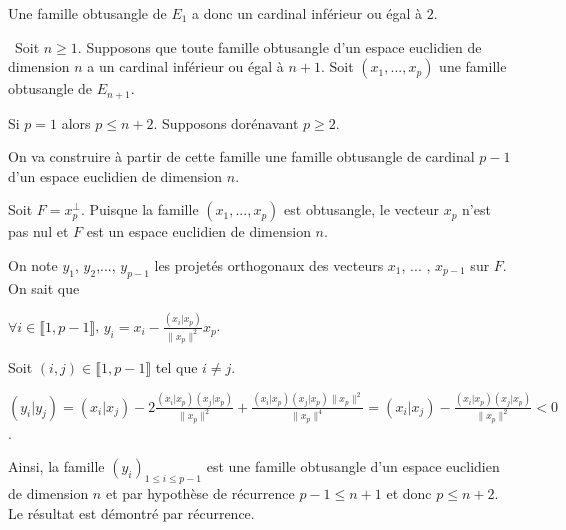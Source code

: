 {{Une famille obtusangle de $E_1$ a donc un cardinal inférieur ou égal à $2$.

\textbullet~Soit $n\geqslant1$. Supposons que toute famille obtusangle d'un espace euclidien de dimension $n$ a un cardinal inférieur ou égal à $n+1$. Soit $(x_1,...,x_p)$ une famille obtusangle de $E_{n+1}$.

Si $p = 1$ alors $p\leqslant n+2$. Supposons dorénavant $p\geqslant2$.

On va construire à partir de cette famille une famille obtusangle de cardinal $p-1$ d'un espace euclidien de dimension $n$.

Soit $F=x_p^\bot$. Puisque la famille $(x_1,...,x_p)$ est obtusangle, le vecteur $x_p$ n'est pas nul et $F$ est un espace euclidien de dimension $n$.

On note $y_1$, $y_2$,..., $y_{p-1}$ les projetés orthogonaux des vecteurs $x_1$, ... , $x_{p-1}$ sur $F$. On sait que

\begin{center}
$\forall i\in\llbracket1,p-1\rrbracket$, $y_i =x_i -\frac{\left(x_i|x_p\right)}{\|x_p\|^2}x_p$.
\end{center}

Soit $(i,j)\in\llbracket1,p-1\rrbracket$ tel que $i\neq j$.

\begin{center}
$\left(y_i|y_j\right)=\left(x_i|x_j\right)-2\frac{\left(x_i|x_p\right)\left(x_j|x_p\right)}{\|x_p\|^2}+\frac{\left(x_i|x_p\right)\left(x_j|x_p\right)\|x_p\|^2}{\|x_p\|^4}= \left(x_i|x_j\right)-\frac{\left(x_i|x_p\right)\left(x_j|x_p\right)}{\|x_p\|^2}< 0$.
\end{center}

Ainsi, la famille $(y_i)_{1\leqslant i\leqslant p-1}$ est une famille obtusangle d'un espace euclidien de dimension $n$ et par hypothèse de récurrence $p-1\leqslant n+1$ et donc $p\leqslant n+2$. Le résultat est démontré par récurrence.
}
}
